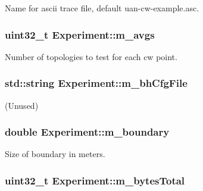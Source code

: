 Name for ascii trace file, default uan-\/cw-\/example.\+asc. 

\subsubsection[{\texorpdfstring{m\+\_\+avgs}{m_avgs}}]{\setlength{\rightskip}{0pt plus 5cm}uint32\+\_\+t Experiment\+::m\+\_\+avgs}\hypertarget{classExperiment_a51ad00a867fb74254c5ec3d4e0e34272}{}\label{classExperiment_a51ad00a867fb74254c5ec3d4e0e34272}


Number of topologies to test for each cw point. 

\subsubsection[{\texorpdfstring{m\+\_\+bh\+Cfg\+File}{m_bhCfgFile}}]{\setlength{\rightskip}{0pt plus 5cm}std\+::string Experiment\+::m\+\_\+bh\+Cfg\+File}\hypertarget{classExperiment_a91038b741239a7597fbabc94b7b02fa4}{}\label{classExperiment_a91038b741239a7597fbabc94b7b02fa4}


(Unused) 

\subsubsection[{\texorpdfstring{m\+\_\+boundary}{m_boundary}}]{\setlength{\rightskip}{0pt plus 5cm}double Experiment\+::m\+\_\+boundary}\hypertarget{classExperiment_add5ef2ea8606e6b0f640d46cae90106f}{}\label{classExperiment_add5ef2ea8606e6b0f640d46cae90106f}


Size of boundary in meters. 

\subsubsection[{\texorpdfstring{m\+\_\+bytes\+Total}{m_bytesTotal}}]{\setlength{\rightskip}{0pt plus 5cm}uint32\+\_\+t Experiment\+::m\+\_\+bytes\+Total}\hypertarget{classExperiment_a301a75788bd76a56362d21e5ac3b45ca}{}\label{classExperiment_a301a75788bd76a56362d21e5ac3b45ca}


